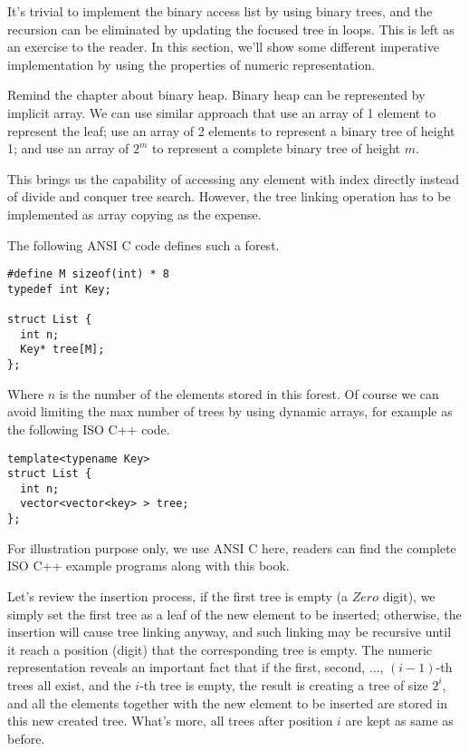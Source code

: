 \documentclass[UTF8]{article}
\begin{document}
It's trivial to implement the binary access list by using binary trees, and the
recursion can be eliminated by updating the focused tree in loops. This is left
as an exercise to the reader. In this section, we'll show some different imperative
implementation by using the properties of numeric representation.

Remind the chapter about binary heap. Binary heap can be represented by
implicit array. We can use similar approach that use an array of 1 element to
represent the leaf; use an array of 2 elements to represent a binary tree of height 1;
and use an array of $2^m$ to represent a complete binary tree of height $m$.

This brings us the capability of accessing any element with index directly instead
of divide and conquer tree search. However, the tree linking operation has to
be implemented as array copying as the expense.

The following ANSI C code defines such a forest.

\lstset{language=C}
\begin{lstlisting}
#define M sizeof(int) * 8
typedef int Key;

struct List {
  int n;
  Key* tree[M];
};
\end{lstlisting}

Where $n$ is the number of the elements stored in this forest.
Of course we can avoid limiting the max number of trees by using dynamic arrays, for
example as the following ISO C++ code.

\lstset{language=C++}
\begin{lstlisting}
template<typename Key>
struct List {
  int n;
  vector<vector<key> > tree;
};
\end{lstlisting}

For illustration purpose only, we use ANSI C here, readers can find the complete ISO C++
example programs along with this book.

Let's review the insertion process, if the first tree is empty (a $Zero$ digit), we simply
set the first tree as a leaf of the new element to be inserted; otherwise, the insertion
will cause tree linking anyway, and such linking may be recursive until it reach a
position (digit) that the corresponding tree is empty. The numeric representation
reveals an important fact that if the first, second, ..., $(i-1)$-th trees all
exist, and the $i$-th tree is empty, the result is creating a tree of size $2^i$,
and all the elements together with the new element to be inserted are stored in
this new created tree. What's more, all trees after position $i$ are kept as same
as before.
\end{document}
